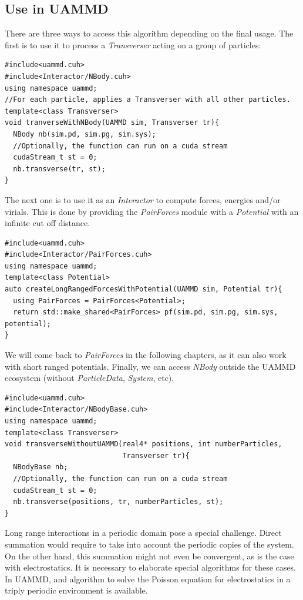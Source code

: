 \documentclass[ twoside,openright,titlepage,numbers=noenddot,%
headinclude,footinclude,cleardoublepage=empty,abstract=on,
BCOR=5mm,paper=a4,fontsize=11pt, dvipsnames
]{scrreprt}
\def\ucpp{uammd_cpp_lexer.py:UAMMDCppLexer -x}
\newcommand{\uammd}{\gls{UAMMD}\xspace}
\begin{document}
\subsection{Use in UAMMD}
There are three ways to access this algorithm depending on the final usage.
The first is to use it to process a \emph{Transverser} acting on a group of particles:
\begin{verbatim}
#include<uammd.cuh>
#include<Interactor/NBody.cuh>
using namespace uammd;
//For each particle, applies a Transverser with all other particles.
template<class Transverser>
void tranverseWithNBody(UAMMD sim, Transverser tr){
  NBody nb(sim.pd, sim.pg, sim.sys);
  //Optionally, the function can run on a cuda stream
  cudaStream_t st = 0;
  nb.transverse(tr, st);
}
\end{verbatim}
The next one is to use it as an \emph{Interactor} to compute forces, energies and/or virials. This is done by providing the \emph{PairForces} module with a \emph{Potential} with an infinite cut off distance.
\begin{verbatim}
#include<uammd.cuh>
#include<Interactor/PairForces.cuh>
using namespace uammd;
template<class Potential>
auto createLongRangedForcesWithPotential(UAMMD sim, Potential tr){
  using PairForces = PairForces<Potential>;
  return std::make_shared<PairForces> pf(sim.pd, sim.pg, sim.sys, potential);
}
\end{verbatim}
We will come back to \emph{PairForces} in the following chapters, as it can also work with short ranged potentials.
Finally, we can access \emph{NBody} outside the \uammd ecosystem (without \emph{ParticleData}, \emph{System}, etc).
\begin{verbatim}
#include<uammd.cuh>
#include<Interactor/NBodyBase.cuh>
using namespace uammd;
template<class Transverser>
void transverseWithoutUAMMD(real4* positions, int numberParticles,
                            Transverser tr){
  NBodyBase nb;
  //Optionally, the function can run on a cuda stream
  cudaStream_t st = 0;
  nb.transverse(positions, tr, numberParticles, st);
}
\end{verbatim}


Long range interactions in a periodic domain pose a special challenge. Direct summation would require to take into account the periodic copies of the system. On the other hand, this summation might not even be convergent, as is the case with electrostatics. It is necessary to elaborate special algorithms for these cases. In \uammd, and algorithm to solve the Poisson equation for electrostatics in a triply periodic environment is available.
\end{document}
